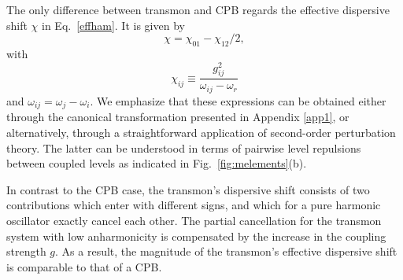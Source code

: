\documentclass[twocolumn,amsmath,amssymb,floatfix,pra,showpacs,eqsecnum,footinbib,superscriptaddress]{revtex4}
\newcounter{fig}
\newcommand{\be}{\begin{equation}}
\newcommand{\ee}{\end{equation}}
\begin{document}
The only difference between transmon and CPB regards the effective dispersive shift $\chi$ in Eq.~\eqref{effham}. It is given by
\be\label{chi-full}
\chi = \chi_{01} - \chi_{12}/2,
\ee
with
\be\label{chieq}
\chi_{ij}\equiv \frac{g_{ij}^2}{\omega_{ij}-\omega_r}
\ee
and $\omega_{ij}=\omega_j-\omega_i$. We emphasize that these expressions can be obtained either through the canonical transformation presented in  Appendix \ref{app1}, or alternatively, through a straightforward application of second-order perturbation theory. The latter can be understood in terms of pairwise level repulsions between coupled levels as indicated in Fig.~\ref{fig:melements}(b). 

In contrast to the CPB case, the transmon's dispersive shift consists of two contributions which enter with different signs, and which for a pure harmonic oscillator exactly cancel each other. The partial cancellation for the transmon system with low anharmonicity is compensated by the increase in the coupling strength $g$. As a result, the magnitude of the transmon's effective dispersive shift is comparable to that of a CPB.
\end{document}
